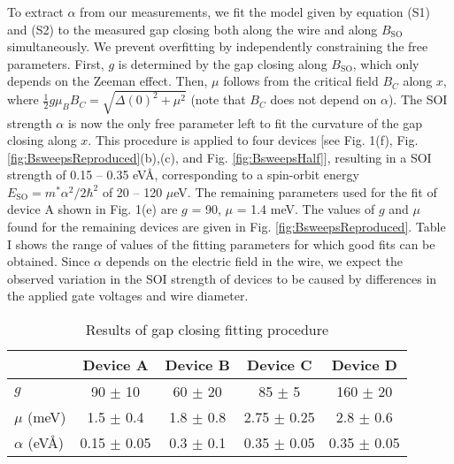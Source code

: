 \documentclass[prl,singlecolumn,notitlepage,secnumroman,superscriptaddress,nobibnotes,graphicx,amsmath,amssymb]{revtex4-2}
\begin{document}
To extract $\alpha$ from our measurements, we fit the model given by equation (S1) and (S2) to the measured gap closing both along the wire and along $B_{\mathrm{SO}}$ simultaneously. We prevent overfitting by independently constraining the free parameters. First, $g$ is determined by the gap closing along $B_{\mathrm{SO}}$, which only depends on the Zeeman effect. Then, $\mu$ follows from the critical field $B_C$ along $x$, where $\frac{1}{2}g\mu_BB_C = \sqrt{\Delta(0)^2+\mu^2}$ \cite{Lutchyn2010,Oreg2010} (note that $B_C$ does not depend on $\alpha$). The SOI strength $\alpha$ is now the only free parameter left to fit the curvature of the gap closing along $x$. This procedure is applied to four devices [see Fig. 1(f), Fig. \ref{fig:BsweepsReproduced}(b),(c), and Fig. \ref{fig:BsweepsHalf}], resulting in a SOI strength of 0.15 -- 0.35 eV\AA, corresponding to a spin-orbit energy $E_{\mathrm{SO}}=m^*\alpha^2/2\hbar^2$ of 20 -- 120 $\mu$eV. The remaining parameters used for the fit of device A shown in Fig. 1(e) are $g$ = 90, $\mu$ = 1.4 meV. The values of $g$ and $\mu$ found for the remaining devices are given in Fig. \ref{fig:BsweepsReproduced}. Table I shows the range of values of the fitting parameters for which good fits can be obtained. Since $\alpha$ depends on the electric field in the wire, we expect the observed variation in the SOI strength of devices to be caused by differences in the applied gate voltages and wire diameter.

\begin{table}[h]
\label{tab:AlphaFit}
\caption{Results of gap closing fitting procedure}
\begin{tabular}{l|cccc}
& Device A & Device B & Device C & Device D \\
\hline 
$g$ & 90 $\pm$ 10 & 60 $\pm$ 20 & 85 $\pm$ 5 & 160 $\pm$ 20\\
$\mu$ (meV) & 1.5 $\pm$ 0.4 & 1.8 $\pm$ 0.8 & 2.75 $\pm$ 0.25 & 2.8 $\pm$ 0.6\\
$\alpha$ (eV\AA) & 0.15 $\pm$ 0.05 & 0.3 $\pm$ 0.1 & 0.35 $\pm$ 0.05 & 0.35 $\pm$ 0.05\\
\end{tabular}
\end{table}
\end{document}
